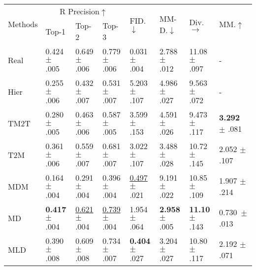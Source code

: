\documentclass[10pt,twocolumn,letterpaper]{article}
\begin{document}
\begin{table*}[ht]

\begin{center}
\begin{tabular}{p{2.15cm}p{1.70cm}p{1.70cm}p{1.70cm}p{1.70cm}p{1.70cm}p{1.70cm}p{1.70cm}}
\hline
\multirow{2}{*}{Methods}&\multicolumn{3}{c}{R Precision$\uparrow$}& \multirow{2}{*}{FID.$\downarrow$}&\multirow{2}{*}{MM-D.$\downarrow$}& \multirow{2}{*}{Div.$\rightarrow$}& \multirow{2}{*}{MM.$\uparrow$}\\ \cline{2-4}
&Top-1&Top-2&Top-3&&&&\\
\hline

 Real& 0.424 \tiny $\pm$ .005& 0.649  \tiny $\pm$ .006& 0.779  \tiny $\pm$ .006& 0.031  \tiny $\pm$ .004&2.788  \tiny $\pm$ .012 &11.08 \tiny $\pm$ .097 &-\\
 \hline

Hier~\cite{ghosh2021synthesis} & 0.255 \tiny $\pm$ .006& 0.432  \tiny $\pm$ .007& 0.531  \tiny $\pm$ .007& 5.203  \tiny $\pm$ .107&4.986 \tiny $\pm$ .027 &9.563 \tiny $\pm$ .072 &-\\

TM2T~\cite{guo2022tm2t} & 0.280 \tiny $\pm$ .005& 0.463  \tiny $\pm$ .006& 0.587 \tiny $\pm$ .005& 3.599  \tiny $\pm$ .153&4.591  \tiny $\pm$ .026 &9.473 \tiny $\pm$ .117 &\textbf{3.292} \tiny $\pm$ .081\\

T2M~\cite{guo2022generating} & 0.361 \tiny $\pm$ .006& 0.559  \tiny $\pm$ .007& 0.681 \tiny $\pm$ .007& 3.022 \tiny $\pm$ .107&3.488  \tiny $\pm$ .028 &10.72 \tiny $\pm$ .145 &2.052 \tiny $\pm$ .107\\

MDM~\cite{tevet2023human} & 0.164 \tiny $\pm$ .004& 0.291  \tiny $\pm$ .004& 0.396  \tiny $\pm$ .004& \underline{0.497}  \tiny $\pm$ .021&9.191 \tiny $\pm$ .022 &10.85 \tiny $\pm$ .109 &1.907 \tiny $\pm$ .214\\

MD~\cite{zhang2022motiondiffuse} & \textbf{0.417} \tiny $\pm$ .004& \underline{0.621}  \tiny $\pm$ .004& \underline{0.739}  \tiny $\pm$ .004& 1.954 \tiny $\pm$ .064&\textbf{2.958} \tiny $\pm$ .005 &\textbf{11.10} \tiny $\pm$ .143 & 0.730\tiny \ $\pm$ .013\\

MLD~\cite{chen2023mld} & 0.390 \tiny $\pm$ .008& 0.609 \tiny $\pm$ .008& 0.734  \tiny $\pm$ .007& \textbf{0.404}  \tiny $\pm$ .027&3.204  \tiny $\pm$ .027&10.80 \tiny $\pm$ .117 &2.192 \tiny $\pm$ .071\\


\end{tabular}
\end{center}
\end{table*}
\end{document}
